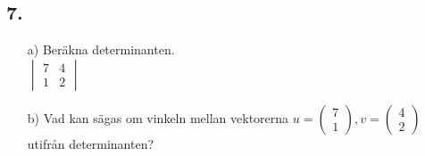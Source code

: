 \documentclass{article}
\begin{document}
\subsection*{7.}
\begin{itemize}
    \item[a) ]	Beräkna determinanten.
				\newline
				\\
				$ 
    			\begin{vmatrix}
   		 		7  & 4 \\
  		  		1  & 2
		    	\end{vmatrix}
  			  	$
    \item[b) ]	Vad kan sägas om vinkeln mellan vektorerna 
    			$
    			u =   			  
				\begin{pmatrix}
   		 		7  \\
  		  		1  
		    	\end{pmatrix}  		
		    	,
		    	v =   			  
				\begin{pmatrix}
   		 		4  \\
  		  		2  
		    	\end{pmatrix}  			
		    	$ 
		    	utifrån determinanten?
\end{itemize}
\end{document}
